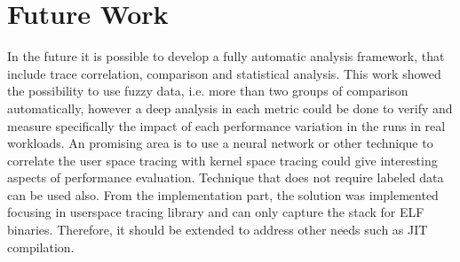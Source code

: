 \section{Future Work}
In the future it is possible to develop a fully automatic analysis framework, that include trace correlation, comparison and statistical analysis. 
This work showed the possibility to use fuzzy data, i.e. more than two groups of comparison automatically, however a deep analysis in each metric could be done to verify and measure specifically the impact of each performance variation in the runs in real workloads. 
An promising area is to use a neural network or other technique to correlate the user space tracing with kernel space tracing could give interesting aspects of performance evaluation. Technique that does not require labeled data can be used also.
From the implementation part, the solution was implemented focusing in userspace tracing library and can only capture the stack for ELF binaries. Therefore, it should be extended to address other needs such as JIT compilation.


